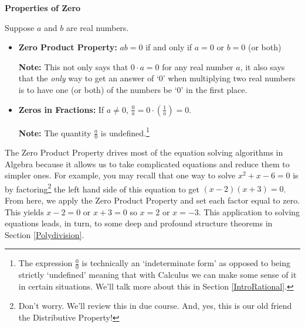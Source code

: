 \documentclass{ximera}
\begin{document}

\centerline{\textbf{Properties of Zero}}

Suppose $a$ and $b$ are real numbers.

\begin{itemize}

\item  \textbf{Zero Product Property:} $ab = 0$ if and only if $a=0$ or $b=0$ (or both)

\textbf{Note:} This not only says that $0 \cdot a = 0$ for any real number $a$, it also says that the \textit{only} way to get an answer of `$0$' when multiplying two real numbers  is to have one (or both) of the numbers be `$0$' in the first place.

\item  \textbf{Zeros in Fractions:}  If $a \neq 0$, $\frac{0}{a} = 0 \cdot \left(\frac{1}{a}\right) = 0$.

\textbf{Note:}  The quantity $\frac{a}{0}$ is undefined.\footnote{The expression $\frac{0}{0}$ is technically an `indeterminate form' as opposed to being strictly `undefined' meaning that with Calculus we can make some sense of it in certain situations.  We'll talk more about this in Section \ref{IntroRational}.}

\end{itemize}


\pagebreak

The Zero Product Property drives most of the equation solving algorithms in Algebra because it allows us to take complicated equations and reduce them to simpler ones.  For example, you may recall that one way to solve  $x^2+x-6=0$ is by factoring\footnote{Don't worry.  We'll review this in due course.  And, yes, this is our old friend the Distributive Property!} the left hand side of this equation to get  $(x-2)(x+3) = 0$.  From here, we apply the Zero Product Property and set each factor equal to zero.  This yields  $x-2=0$ or $x+3=0$ so $x=2$ or $x=-3$.  This application to solving equations leads, in turn,  to some deep and profound structure theorems in Section \ref{Polydivision}. 

\medskip
\end{document}
